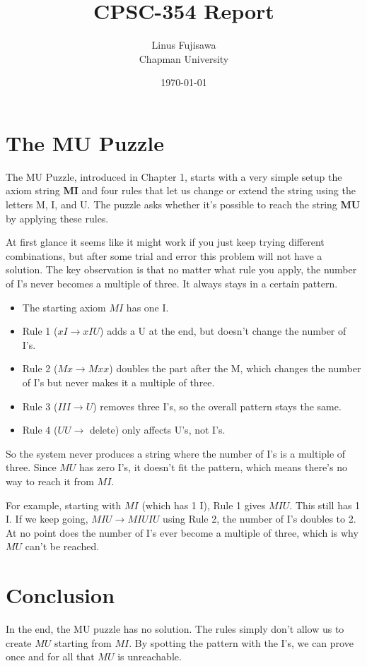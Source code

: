 \documentclass{article}
\title{CPSC-354 Report}
\author{Linus Fujisawa \\ Chapman University}
\date{\today}
\theoremstyle{theorem}
\theoremstyle{definition}
\theoremstyle{remark}
\begin{document}
\maketitle



\setcounter{tocdepth}{3}

\section*{The MU Puzzle}

The MU Puzzle, introduced in Chapter 1, starts with a very simple setup the axiom string \textbf{MI} and four rules that let us change or extend the string using the letters M, I, and U. The puzzle asks whether it’s possible to reach the string \textbf{MU} by applying these rules.

At first glance it seems like it might work if you just keep trying different combinations, but after some trial and error this problem will not have a solution. The key observation is that no matter what rule you apply, the number of I’s never becomes a multiple of three. It always stays in a certain pattern.

\begin{itemize}
  \item The starting axiom $MI$ has one I.
  \item Rule 1 ($xI \to xIU$) adds a U at the end, but doesn’t change the number of I’s.
  \item Rule 2 ($Mx \to Mxx$) doubles the part after the M, which changes the number of I’s but never makes it a multiple of three.
  \item Rule 3 ($III \to U$) removes three I’s, so the overall pattern stays the same.
  \item Rule 4 ($UU \to$ delete) only affects U’s, not I’s.
\end{itemize}


So the system never produces a string where the number of I’s is a multiple of three. Since $MU$ has zero I’s, it doesn’t fit the pattern, which means there’s no way to reach it from $MI$.

\par
For example, starting with $MI$ (which has 1 I), Rule 1 gives $MIU$. This still has 1 I. If we keep going, $MIU \to MIUIU$ using Rule 2, the number of I’s doubles to 2. At no point does the number of I’s ever become a multiple of three, which is why $MU$ can’t be reached.

\section*{Conclusion}
In the end, the MU puzzle has no solution. The rules simply don’t allow us to create $MU$ starting from $MI$. By spotting the pattern with the I’s, we can prove once and for all that $MU$ is unreachable.
\end{document}
